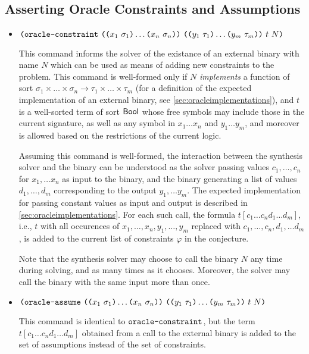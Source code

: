 \documentclass[english,a4paper,10pt]{article}
\begin{document}
\subsection{Asserting Oracle Constraints and Assumptions}
\begin{itemize}
\item $\texttt{(}\texttt{oracle-constraint}\mbox{ }  
\texttt{(}\texttt{(}x_1\mbox{ }\sigma_1\texttt{)} \ldots \texttt{(}x_n\mbox{ }\sigma_n\texttt{)}\texttt{)}\mbox{ }
\texttt{(}\texttt{(}y_{1}\mbox{ }\tau_{1}\texttt{)} \ldots \texttt{(}y_{m}\mbox{ }\tau_{m}\texttt{)}\texttt{)}  \mbox{ } t \mbox{ } N \texttt{)}$

This command informs the solver of the existance of an external binary with name $N$
which can be used as means of adding new constraints to the problem.
This command is well-formed only if $N$
\emph{implements} a function of sort $\sigma_1 \times \ldots \times \sigma_n \rightarrow \tau_{1} \times \ldots \times \tau_{m}$
(for a definition of the expected implementation of an external binary, see \cref{sec:oracleimplementations}),
and $t$ is a well-sorted term of sort $\mathsf{Bool}$ 
whose free symbols may include those in the current signature, as well as any symbol in $x_1 \ldots x_{n}$ and $y_1 \ldots y_{m}$,
and moreover is allowed based on the restrictions of the current logic.

Assuming this command is well-formed,
the interaction between the synthesis solver and the binary
can be understood as the solver passing values
$c_1, \ldots, c_n$ for $x_1, \ldots x_n$ as input to the binary,
and the binary generating a list of values
$d_{1}, \ldots, d_{m}$ corresponding to the output $y_{1}, \ldots y_{m}$.
The expected implementation for passing
constant values as input and output 
is described in \cref{sec:oracleimplementations}.
For each such call,
the formula $t[c_1 \ldots c_{n} d_1 \ldots d_m]$, i.e., 
$t$ with all occurences of $x_1, \ldots, x_{n}, y_1, \ldots, y_m$ replaced with $c_1, \ldots, c_{n}, d_1, \ldots d_m$, 
is added to the current list of constraints $\varphi$ in the conjecture.

Note that 
the synthesis solver may choose to call the binary $N$ 
any time during solving, and as many times as it chooses.
Moreover, the solver may call the binary with
the same input more than once.

\item 
$\texttt{(}\texttt{oracle-assume}\mbox{ }
\texttt{(}\texttt{(}x_1\mbox{ }\sigma_1\texttt{)} \ldots \texttt{(}x_n\mbox{ }\sigma_n\texttt{)}\texttt{)}\mbox{ }
\texttt{(}\texttt{(}y_{1}\mbox{ }\tau_{1}\texttt{)} \ldots \texttt{(}y_{m}\mbox{ }\tau_{m}\texttt{)}\texttt{)}  \mbox{ } t \mbox{ } N \texttt{)}$

This command is identical to $\texttt{oracle-constraint}$,
but the term $t[c_1 \ldots c_{n} d_1 \ldots d_m]$ obtained from a call to the external binary
is added to the set of assumptions instead of the set of constraints.

\end{itemize}
\end{document}
